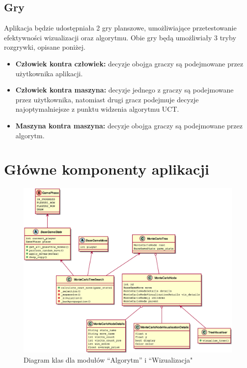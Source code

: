 \documentclass{article}
\let\oldsection\section
\renewcommand\section{\clearpage\oldsection}
\begin{document}
	
	\subsection{Gry}
	Aplikacja będzie udostępniała 2 gry planszowe, umożliwiające przetestowanie efektywności wizualizacji oraz algorytmu. Obie gry będą umożliwiały 3 tryby rozgrywki, opisane poniżej. \\
	
	\begin{itemize}
		\item \textbf{Człowiek kontra człowiek:} decyzje obojga graczy są podejmowane przez użytkownika aplikacji.
		\item \textbf{Człowiek kontra maszyna:} decyzje jednego z graczy są podejmowane przez użytkownika, natomiast drugi gracz podejmuje decyzje najoptymalniejsze z punktu widzenia algorytmu UCT.
		\item \textbf{Maszyna kontra maszyna:} decyzje obojga graczy są podejmowane przez algorytm. \\ 
	\end{itemize}
	
	
	\section{Główne komponenty aplikacji}
	\begin{figure}[h]
		\centering
		\includegraphics[width=\textwidth]{umldiagram}
		\caption{Diagram klas dla modułów ``Algorytm'' i ``Wizualizacja"}
		\label{rys:umldiagrammain}
	\end{figure}
	
\end{document}
